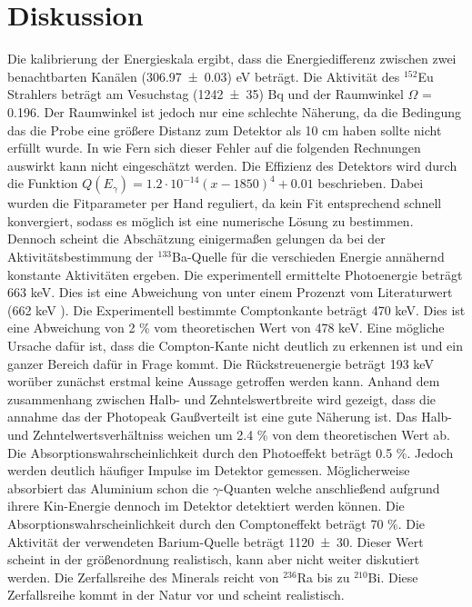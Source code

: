 \section{Diskussion}
\label{sec:Diskussion}
Die kalibrierung der Energieskala ergibt, dass die Energiedifferenz zwischen zwei benachtbarten Kanälen (\num{306.97 +- 0.03}) eV beträgt. Die Aktivität des $^{152}$Eu Strahlers beträgt am Vesuchstag (\num{1242 +- 35}) Bq und der Raumwinkel $\Omega$ = 0.196. Der Raumwinkel ist jedoch nur eine schlechte Näherung, da die Bedingung das die Probe eine größere Distanz zum Detektor als 10 cm haben sollte nicht erfüllt wurde. In wie Fern sich dieser Fehler auf die folgenden Rechnungen auswirkt kann nicht eingeschätzt werden. Die Effizienz des Detektors wird durch die Funktion $Q(E_\gamma) = 1.2 \cdot 10^{-14} (x-1850)^4 +0.01$ beschrieben. Dabei wurden die Fitparameter per Hand reguliert, da kein Fit entsprechend schnell konvergiert, sodass es möglich ist eine numerische Lösung zu bestimmen. Dennoch scheint die Abschätzung einigermaßen gelungen da bei der Aktivitätsbestimmung der $^{133}$Ba-Quelle für die verschieden Energie annähernd konstante Aktivitäten ergeben. Die experimentell ermittelte Photoenergie beträgt 663 keV. Dies ist eine Abweichung von unter einem Prozenzt vom Literaturwert (662 keV \cite{Cs}). Die Experimentell bestimmte Comptonkante beträgt 470 keV. Dies ist eine Abweichung von 2 \% vom theoretischen Wert von 478 keV. Eine mögliche Ursache dafür ist, dass die Compton-Kante nicht deutlich zu erkennen ist und ein ganzer Bereich dafür in Frage kommt. Die Rückstreuenergie beträgt 193 keV worüber zunächst erstmal keine Aussage getroffen werden kann. Anhand dem zusammenhang zwischen Halb- und Zehntelswertbreite wird gezeigt, dass die annahme das der Photopeak Gaußverteilt ist eine gute Näherung ist. Das Halb- und Zehntelwertsverhältniss weichen um 2.4 \% von dem theoretischen Wert ab. Die Absorptionswahrscheinlichkeit durch den Photoeffekt beträgt 0.5 \%. Jedoch werden deutlich häufiger Impulse im Detektor gemessen. Möglicherweise absorbiert das Aluminium schon die $\gamma$-Quanten welche anschließend aufgrund ihrere Kin-Energie dennoch im Detektor detektiert werden können. Die Absorptionswahrscheinlichkeit durch den Comptoneffekt beträgt 70 \%. Die Aktivität der verwendeten Barium-Quelle beträgt \num{1120 +- 30}. Dieser Wert scheint in der größenordnung realistisch, kann aber nicht weiter diskutiert werden. Die Zerfallsreihe des Minerals reicht von $^{236}$Ra bis zu $^{210}$Bi. Diese Zerfallsreihe kommt in der Natur vor und scheint realistisch.
